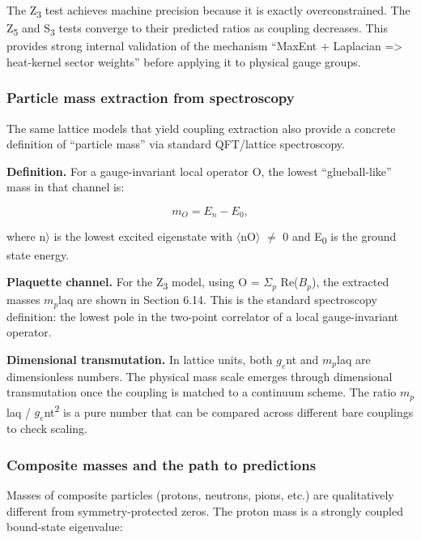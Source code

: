 \documentclass[11pt,a4paper]{article}
\theoremstyle{remark}
\begin{document}
The Z\textsubscript{3} test achieves machine precision because it is exactly
overconstrained. The Z\textsubscript{5} and S\textsubscript{3} tests converge to their
predicted ratios as coupling decreases. This provides strong internal
validation of the mechanism ``MaxEnt + Laplacian =\textgreater{} heat-kernel
sector weights'' before applying it to physical gauge groups.

\subsubsection{Particle mass extraction from spectroscopy}\label{particle-mass-extraction-from-spectroscopy}

The same lattice models that yield coupling extraction also provide a concrete
definition of ``particle mass'' via standard QFT/lattice spectroscopy.

\textbf{Definition.} For a gauge-invariant local operator O, the lowest
``glueball-like'' mass in that channel is:

\[
m_O = E_n - E_0,
\]

where \textbar n\ensuremath{\rangle} is the lowest excited eigenstate with \ensuremath{\langle}n\textbar O\ensuremath{\rangle} \ensuremath{\neq} 0
and E\textsubscript{0} is the ground state energy.

\textbf{Plaquette channel.} For the Z\textsubscript{3} model, using
O = \(\ensuremath{\Sigma}_p\) Re(\(B_p\)), the extracted masses \(m_p\)laq are
shown in Section 6.14. This is the standard spectroscopy definition: the lowest
pole in the two-point correlator of a local gauge-invariant operator.

\textbf{Dimensional transmutation.} In lattice units, both \(g_e\)nt and
\(m_p\)laq are dimensionless numbers. The physical mass scale emerges
through dimensional transmutation once the coupling is matched to a continuum
scheme. The ratio \(m_p\)laq / \(g_e\)nt\textsuperscript{2} is a pure number
that can be compared across different bare couplings to check scaling.

\subsubsection{Composite masses and the path to predictions}\label{composite-masses-and-the-path-to-predictions}

Masses of composite particles (protons, neutrons, pions, etc.) are
qualitatively different from symmetry-protected zeros. The proton mass is a
strongly coupled bound-state eigenvalue:
\end{document}
